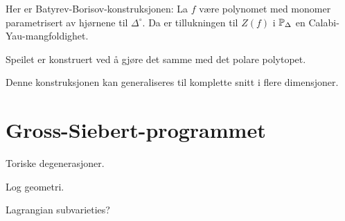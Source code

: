 \documentclass[11pt, norsk]{article}
\begin{document}
Her er Batyrev-Borisov-konstruksjonen: La $f$ være polynomet med monomer parametrisert av hjørnene til $\Delta^\circ$. Da er tillukningen til $Z(f)$ i $\mathbb{P}_\Delta$ en Calabi-Yau-mangfoldighet.

Speilet er konstruert ved å gjøre det samme med det polare polytopet.

Denne konstruksjonen kan generaliseres til komplette snitt i flere dimensjoner.

\section{Gross-Siebert-programmet}

Toriske degenerasjoner.

Log geometri.

Lagrangian subvarieties? 
\end{document}

